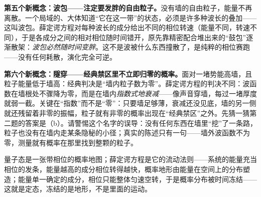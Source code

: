 \begin{mainline}
\textbf{第五个新概念：波包——注定要发胖的自由粒子。}没有墙的自由粒子，能量不再离散。一个局域的、大体知道“它在这一带”的状态，必须是许多种波长的叠加——这叫波包。薛定谔方程对每种波长的成分给出不同的相位转速（能量不同，转速不同），于是各成分之间的相对相位随时间错开，原先靠精密配合堆出来的“鼓包”逐渐散架：\emph{波包必然随时间变胖}。这不是波被什么东西撞散了，是纯粹的相位赛跑——没有任何耗散，演化完全可逆。

\textbf{第六个新概念：隧穿——经典禁区里不立即归零的概率。}面对一堵势能高墙，且粒子能量低于墙高：经典判决是“墙内粒子数为零”。薛定谔方程的判决不同：波函数在墙根处不骤降为零，而是在墙内\emph{指数式地衰减}——像声音穿墙，每过一堵厚度就弱一截。关键在“指数”而不是“零”：只要墙足够薄，衰减还没见底，墙的另一侧就还残留着非零的振幅，粒子就有非零的概率出现在“经典禁区”之外。先猜一猜第二题的答案是（b）。请警惕这个名字的误导：没有任何东西在墙里“挖”了一条路，粒子也没有在墙内走某条隐秘的小径；真实的陈述只有一句——墙外波函数不为零，测量就有概率在那里找到整颗的粒子。
\end{mainline}


\begin{oneline}
量子态是一张带相位的概率地图；薛定谔方程是它的流动法则——系统的能量充当相位的发条，能量越高的成分相位转得越快，概率地形由能量在空间上的分布塑造；能量单一确定的成分，相位只能整体匀速空转，于是概率分布被时间冻结——这就是定态，冻结的是地形，不是里面的运动。
\end{oneline}


